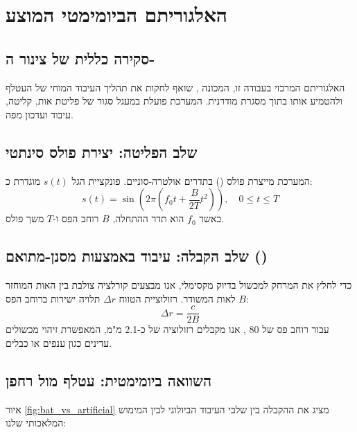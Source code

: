 
\section{האלגוריתם הביומימטי המוצע}
\label{sec:algorithm}

\subsection{סקירה כללית של צינור ה-}
האלגוריתם המרכזי בעבודה זו, המכונה , שואף לחקות את תהליך העיבוד המוחי של העטלף ולהטמיע אותו בתוך מסגרת  מודרנית. המערכת פועלת במעגל סגור של פליטת אות, קליטה, עיבוד ועדכון מפה.

\subsection{שלב הפליטה: יצירת פולס  סינתטי}
המערכת מייצרת פולס  () בתדרים אולטרה-סוניים. פונקציית הגל $s(t)$ מוגדרת כ:
\begin{equation}
    s(t) = \sin\left(2\pi \left(f_0 t + \frac{B}{2T}t^2\right)\right), \quad 0 \le t \le T
    \label{eq:lfm_gen}
\end{equation}
כאשר $f_0$ הוא תדר ההתחלה, $B$ רוחב הפס ו-$T$ משך פולס.

\subsection{שלב הקבלה: עיבוד באמצעות מסנן-מתואם ()}
כדי לחלץ את המרחק למכשול בדיוק מקסימלי, אנו מבצעים קורלציה צולבת בין האות המוחזר לאות המשודר. רזולוציית הטווח $\Delta r$ תלויה ישירות ברוחב הפס $B$:
\begin{equation}
    \Delta r = \frac{c}{2B}
    \label{eq:range_res}
\end{equation}
עבור רוחב פס של 80 , אנו מקבלים רזולוציה של כ-2.1 מ"מ, המאפשרת זיהוי מכשולים עדינים כגון ענפים או כבלים. \cite{Rihaczek1969MatchedFilter}

\subsection{השוואה ביומימטית: עטלף מול רחפן}
איור \ref{fig:bat_vs_artificial} מציג את ההקבלה בין שלבי העיבוד הביולוגי לבין המימוש המלאכותי שלנו:

